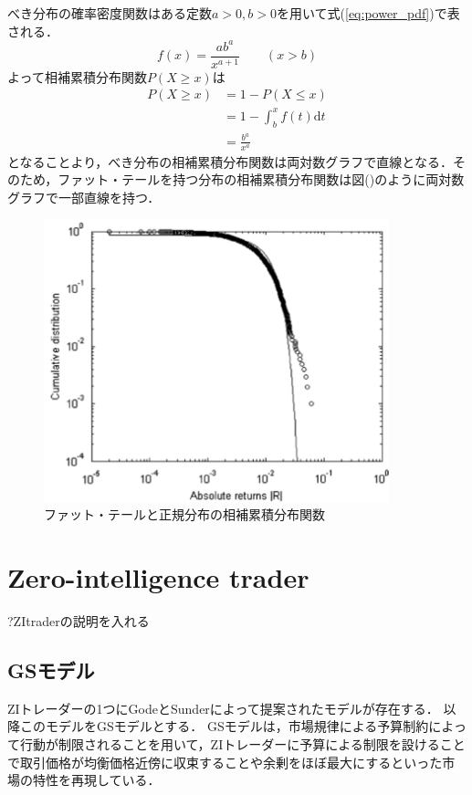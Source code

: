\documentclass[titlepage]{jsreport}
\begin{document}
べき分布の確率密度関数はある定数$a > 0,b > 0$を用いて式(\ref{eq:power_pdf})で表される\cite{PowerDistribution}．
\begin{equation}
    f(x) = \frac{ab^a}{x^{a + 1}} \qquad (x > b) \label{eq:power_pdf}
\end{equation}
よって相補累積分布関数$P(X \geq x)$は
\begin{equation}
    \begin{aligned}
        P(X \geq x) & = 1 - P(X \leq x)                     \\
                    & = 1 - \int_{b}^{x} f(t) \mathrm{d}t   \\
                    & = \frac{b^a}{x^a} \label{eq:survival}
    \end{aligned}
\end{equation}
となることより，べき分布の相補累積分布関数は両対数グラフで直線となる．そのため，ファット・テールを持つ分布の相補累積分布関数は図()のように両対数グラフで一部直線を持つ．

\begin{figure}[htbp]
    \centering
    \includegraphics[width=10cm]{fig/fat_tail_survival.pdf}
    \caption{ファット・テールと正規分布の相補累積分布関数\cite{Cont2007}}
    \label{fig:fat_tail_survival}
\end{figure}


\section{Zero-intelligence trader}
?ZItraderの説明を入れる

\subsection{GSモデル}
ZIトレーダーの1つにGodeとSunderによって提案されたモデルが存在する\cite{Gode_and_Sunder}．
以降このモデルをGSモデルとする．
GSモデルは，市場規律による予算制約によって行動が制限されること\cite{market_displine}を用いて，ZIトレーダーに予算による制限を設けることで取引価格が均衡価格近傍に収束することや余剰をほぼ最大にするといった市場の特性を再現している．
\end{document}
